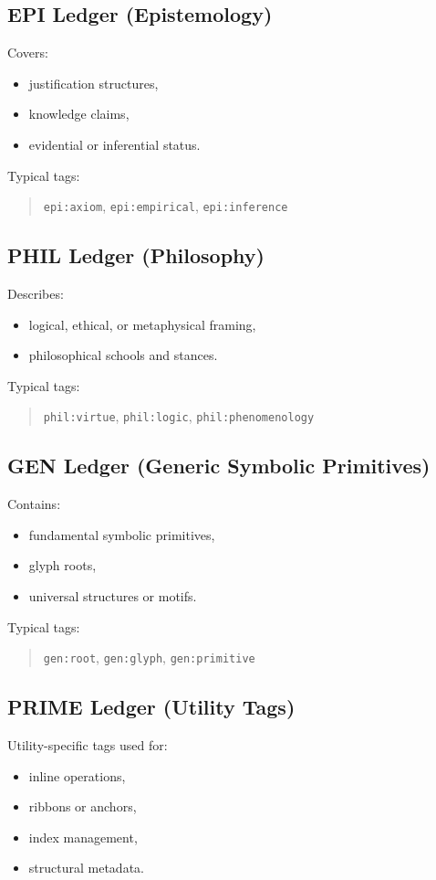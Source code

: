 \subsection{EPI Ledger (Epistemology)}
Covers:
\begin{itemize}
    \item justification structures,
    \item knowledge claims,
    \item evidential or inferential status.
\end{itemize}

Typical tags:
\begin{quote}
\texttt{epi:axiom}, \texttt{epi:empirical}, \texttt{epi:inference}
\end{quote}

\subsection{PHIL Ledger (Philosophy)}
Describes:
\begin{itemize}
    \item logical, ethical, or metaphysical framing,
    \item philosophical schools and stances.
\end{itemize}

Typical tags:
\begin{quote}
\texttt{phil:virtue}, \texttt{phil:logic}, \texttt{phil:phenomenology}
\end{quote}

\subsection{GEN Ledger (Generic Symbolic Primitives)}
Contains:
\begin{itemize}
    \item fundamental symbolic primitives,
    \item glyph roots,
    \item universal structures or motifs.
\end{itemize}

Typical tags:
\begin{quote}
\texttt{gen:root}, \texttt{gen:glyph}, \texttt{gen:primitive}
\end{quote}

\subsection{PRIME Ledger (Utility Tags)}
Utility-specific tags used for:
\begin{itemize}
    \item inline operations,
    \item ribbons or anchors,
    \item index management,
    \item structural metadata.
\end{itemize}

